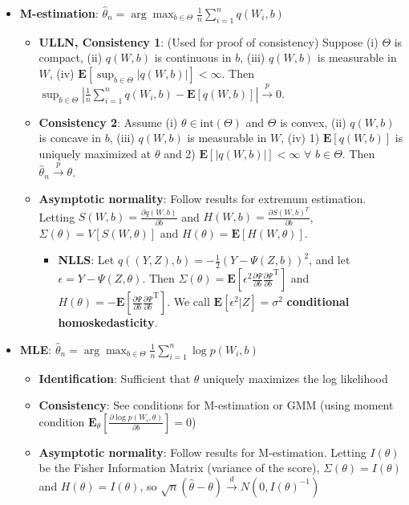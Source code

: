 \documentclass[12pt,english]{article}
\newcommand{\T}{\ensuremath{\text{T}}}
\begin{document}
\begin{itemize}
\begin{itemize}
	\end{itemize}
	\item \textbf{M-estimation}: $\hat{\theta}_{n} = \arg \max_{b \in \Theta} \frac{1}{n} \sum_{i=1}^{n} q(W_{i}, b)$
	\begin{itemize}
		\item \textbf{ULLN, Consistency 1}: (Used for proof of consistency) Suppose (i) $\Theta$ is compact, (ii) $q(W, b)$ is continuous in $b$, (iii) $q(W, b)$ is measurable in $W$, (iv) $\mathbf{E}[\sup_{b \in \Theta} |q(W, b)|] < \infty$. Then $\sup_{b \in \Theta} \left| \frac{1}{n} \sum_{i=1}^{n} q(W_{i}, b) - \mathbf{E}[q(W, b)] \right| \overset{p}{\to} 0$.
		\item \textbf{Consistency 2}: Assume (i) $\theta \in \text{int}(\Theta)$ and $\Theta$ is convex, (ii) $q(W, b)$ is concave in $b$, (iii) $q(W, b)$ is measurable in $W$, (iv) 1) $\mathbf{E}[q(W, b)]$ is uniquely maximized at $\theta$ and 2) $\mathbf{E}[|q(W, b)|] < \infty$ $\forall$ $b \in \Theta$. Then $\hat{\theta}_{n} \overset{p}{\to} \theta$.
		\item \textbf{Asymptotic normality}: Follow results for extremum estimation. Letting $S(W, b) = \frac{\partial q(W, b)}{\partial b}$ and $H(W, b) = \frac{\partial S(W, b)^{T}}{\partial b}$, $\Sigma(\theta) = V[S(W, \theta)]$ and $H(\theta) = \mathbf{E}[H(W, \theta)]$.
		\begin{itemize}
			\item \textbf{NLLS}: Let $q((Y, Z), b) = -\frac{1}{2} (Y - \Psi(Z, b))^{2}$, and let $\epsilon = Y - \Psi(Z, \theta)$. Then $\Sigma(\theta) = \mathbf{E}[\epsilon^{2} \frac{\partial \Psi}{\partial b} \frac{\partial \Psi}{\partial b}^{\T}]$ and $H(\theta) = - \mathbf{E}[\frac{\partial \Psi}{\partial b} \frac{\partial \Psi}{\partial b}^{\T}]$. We call $\mathbf{E}[\epsilon^{2} | Z] = \sigma^{2}$ \textbf{conditional homoskedasticity}.
		\end{itemize}
	\end{itemize}
	\item \textbf{MLE}: $\hat{\theta}_{n} = \arg \max_{b \in \Theta} \frac{1}{n} \sum_{i=1}^{n} \log p(W_{i}, b)$
	\begin{itemize}
		\item \textbf{Identification}: Sufficient that $\theta$ uniquely maximizes the log likelihood
		\item \textbf{Consistency}: See conditions for M-estimation or GMM (using moment condition $ \mathbf{E}_{\theta} \left[ \frac{\partial \log p(W_{i}, \theta)}{\partial b} \right] = 0 $)
		\item \textbf{Asymptotic normality}: Follow results for M-estimation. Letting $I(\theta)$ be the Fisher Information Matrix (variance of the score), $\Sigma(\theta) = I(\theta)$ and $H(\theta) = I(\theta)$, so $\sqrt{n}(\hat{\theta} - \theta) \overset{d}{\to} N(0, I(\theta)^{-1})$

\end{itemize}
\end{itemize}
\end{document}
